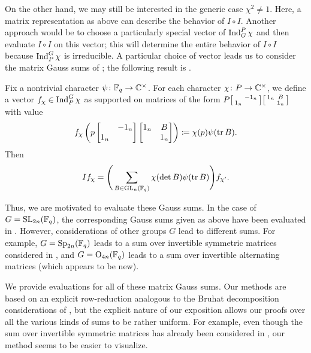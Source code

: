 \documentclass{amsart}
\begin{document}
On the other hand, we may still be interested in the generic case $\chi^2\ne1$. Here, a matrix representation as above can describe the behavior of $I\circ I$. Another approach would be to choose a particularly special vector of $\operatorname{Ind}^P_G\chi$ and then evaluate $I\circ I$ on this vector; this will determine the entire behavior of $I\circ I$ because $\operatorname{Ind}_P^G\chi$ is irreducible. A particular choice of vector leads us to consider the matrix Gauss sums of \cite{kim-gauss-sum}; the following result is .
\begin{theorem}
    Fix a nontrivial character $\psi\colon\mathbb F_q\to\mathbb C^\times$. For each character $\chi\colon P\to\mathbb C^\times$, we define a vector $f_\chi\in\operatorname{Ind}_P^G\chi$ as supported on matrices of the form $P\begin{bsmallmatrix}
        & -1_n \\ 1_n
    \end{bsmallmatrix}\begin{bsmallmatrix}
        1_n & B \\ & 1_n
    \end{bsmallmatrix}$ with value
    \[f_\chi\left(p\begin{bmatrix}
        & -1_n \\ 1_n
    \end{bmatrix}\begin{bmatrix}
        1_n & B \\ & 1_n
    \end{bmatrix}\right)\coloneqq\chi(p)\psi(\operatorname{tr} B).\]
    Then
    \[If_\chi=\Bigg(\sum_{B\in\mathrm{GL}_n(\mathbb F_q)}\chi(\det B)\psi(\operatorname{tr} B)\Bigg)f_{\chi'}.\]
\end{theorem}
Thus, we are motivated to evaluate these Gauss sums. In the case of $G=\mathrm{SL}_{2n}(\mathbb F_q)$, the corresponding Gauss sums given as above have been evaluated in \cite{kim-gauss-sum}. However, considerations of other groups $G$ lead to different sums. For example, $G=\mathrm{Sp}_{2n}(\mathbb F_q)$ leads to a sum over invertible symmetric matrices considered in \cite{saito-sym-gauss-sum}, and $G=\mathrm{O}_{4n}(\mathbb F_q)$ leads to a sum over invertible alternating matrices (which appears to be new).

We provide evaluations for all of these matrix Gauss sums. Our methods are based on an explicit row-reduction analogous to the Bruhat decomposition considerations of \cite{kim-gauss-sum}, but the explicit nature of our exposition allows our proofs over all the various kinds of sums to be rather uniform. For example, even though the sum over invertible symmetric matrices has already been considered in \cite{saito-sym-gauss-sum}, our method seems to be easier to visualize.
\end{document}
